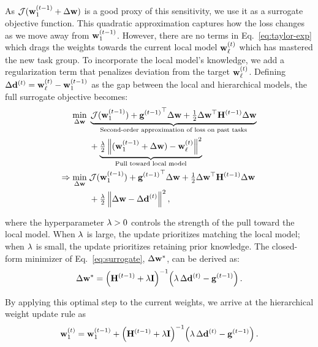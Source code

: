 As $\mathcal{J}(\mathbf{w}_{1}^{(t-1)} + \Delta\mathbf{w})$ is a good proxy of this sensitivity, we use it as a surrogate objective function. This quadratic approximation captures how the loss changes as we move away from $\mathbf{w}_{1}^{(t-1)}$. However, there are no terms in Eq.~\eqref{eq:taylor-exp} which drags the weights towards the current local model $\mathbf{w}_{\ell}^{(t)}$ which has mastered the new task group. To incorporate the local model's knowledge, we add a regularization term that penalizes deviation from the target $\mathbf{w}_{\ell}^{(t)}$. Defining $\Delta\mathbf{d}^{(t)} = \mathbf{w}_{\ell}^{(t)} - \mathbf{w}_{1}^{(t-1)}$ as the gap between the local and hierarchical models, the full surrogate objective becomes: 
\begin{equation}
    \label{eq:surrogate}
    \begin{aligned}
        \min_{\Delta\mathbf{w}}\; & \underbrace{\mathcal{J}(\mathbf{w}_{1}^{(t-1)}) + {\mathbf{g}^{(t-1)}}^\top \Delta\mathbf{w} + \tfrac{1}{2} \Delta\mathbf{w}^\top \mathbf{H}^{(t-1)} \Delta\mathbf{w}}_{\text{Second-order approximation of loss on past tasks}} \\
        & + \underbrace{\tfrac{\lambda}{2} \left\| (\mathbf{w}_{1}^{(t-1)} + \Delta\mathbf{w})- \mathbf{w}_{\ell}^{(t)} \right\|^2}_{\text{Pull toward local model}} \\
        \Rightarrow \min_{\Delta\mathbf{w}}\; & \mathcal{J}(\mathbf{w}_{1}^{(t-1)}) + {\mathbf{g}^{(t-1)}}^\top \Delta\mathbf{w} + \tfrac{1}{2} \Delta\mathbf{w}^\top \mathbf{H}^{(t-1)} \Delta\mathbf{w} \\
        & + \tfrac{\lambda}{2} \left\| \Delta\mathbf{w} - \Delta\mathbf{d}^{(t)} \right\|^2,
    \end{aligned}
\end{equation}

where the hyperparameter $\lambda > 0$ controls the strength of the pull toward the local model. When $\lambda$ is large, the update prioritizes matching the local model; when $\lambda$ is small, the update prioritizes retaining prior knowledge. The closed-form minimizer of Eq.~\eqref{eq:surrogate}, $\Delta\mathbf{w}^{*}$, can be derived as: 
\begin{equation}
\label{eq:deltaW-main}
\Delta\mathbf{w}^{*} = \left(\mathbf{H}^{(t-1)} + \lambda \mathbf{I}\right)^{-1}\!\left(\lambda \, \Delta\mathbf{d}^{(t)} - \mathbf{g}^{(t-1)}\right).
\end{equation}

By applying this optimal step to the current weights, we arrive at the hierarchical weight update rule as
\begin{equation}
\label{eq:hier_update-main}
\mathbf{w}_{1}^{(t)} = \mathbf{w}_{1}^{(t-1)} + \left(\mathbf{H}^{(t-1)} + \lambda \mathbf{I}\right)^{-1}\!\left(\lambda \, \Delta\mathbf{d}^{(t)} - \mathbf{g}^{(t-1)}\right).
\end{equation}

